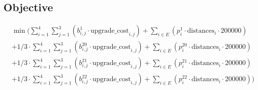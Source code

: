 \documentclass{article}
\begin{document}
	
	\subsection*{Objective}
		\begin{align*}
		&\min(  \sum_{i = 1}^{4} \sum_{j = 1}^{3} (b^{1}_{i,j}  \cdot \text{upgrade\_cost}_{i,j}) + \sum_{i \in E} (p^{1}_i \cdot \text{distances}_{i} \cdot 200000)\\
		&+ 1/3 \cdot \sum_{i = 1}^{4} \sum_{j = 1}^{3} (b^{20}_{i,j}  \cdot \text{upgrade\_cost}_{i,j}) +  \sum_{i \in E} (p^{20}_i \cdot \text{distances}_{i} \cdot 200000) \\
		&+ 1/3 \cdot \sum_{i = 1}^{4} \sum_{j = 1}^{3} (b^{21}_{i,j}  \cdot \text{upgrade\_cost}_{i,j}) +  \sum_{i \in E} (p^{21}_i \cdot \text{distances}_{i} \cdot 200000) \\
		&+ 1/3 \cdot \sum_{i = 1}^{4} \sum_{j = 1}^{3} (b^{22}_{i,j}  \cdot \text{upgrade\_cost}_{i,j}) +  \sum_{i \in E} (p^{22}_i \cdot \text{distances}_{i} \cdot 200000)) \\
		\end{align*}
	  
\end{document}
